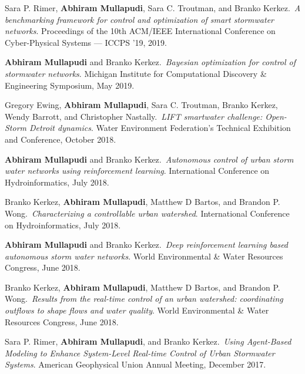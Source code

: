 \documentclass[a4paper,11pt]{article}
\newcommand{\years}[1]{%
  {\reversemarginpar\strut\marginnote{{\small#1}}}%
}
\begin{document}
\years{2019} Sara P. Rimer, \textbf{Abhiram Mullapudi}, Sara C. Troutman, and Branko Kerkez.\ \emph{A benchmarking framework for control and optimization of smart stormwater networks}. Proceedings of the 10th ACM/IEEE International Conference on Cyber-Physical Systems --- ICCPS '19, 2019.\\[.1cm]

\years{2019} \textbf{Abhiram Mullapudi} and Branko Kerkez.\ \emph{Bayesian optimization for control of stormwater networks}. Michigan Institute for Computational Discovery \& Engineering Symposium, May 2019.\\[.1cm]

\years{2018} Gregory Ewing, \textbf{Abhiram Mullapudi}, Sara C. Troutman, Branko Kerkez, Wendy Barrott, and Christopher Nastally.\ \emph{LIFT smartwater challenge: Open-Storm Detroit dynamics}. Water Environment Federation's Technical Exhibition and Conference, October 2018.\\[.1cm]

\years{2018} \textbf{Abhiram Mullapudi} and Branko Kerkez.\ \emph{Autonomous control of urban storm water networks using reinforcement learning}. International Conference on Hydroinformatics, July 2018.\\[.1cm]

\years{2018} Branko Kerkez, \textbf{Abhiram Mullapudi}, Matthew D Bartos, and Brandon P. Wong.\ \emph{Characterizing a controllable urban watershed}. International Conference on Hydroinformatics, July 2018.\\[.1cm]

\years{2018} \textbf{Abhiram Mullapudi} and Branko Kerkez.\ \emph{Deep reinforcement learning based autonomous storm water networks}. World Environmental \& Water Resources Congress, June 2018.\\[.1cm]

\years{2018} Branko Kerkez, \textbf{Abhiram Mullapudi}, Matthew D Bartos, and Brandon P. Wong.\ \emph{Results from the real-time control of an urban watershed: coordinating outflows to shape flows and water quality}. World Environmental \& Water Resources Congress, June 2018.\\[.1cm]

\years{2017} Sara P. Rimer, \textbf{Abhiram Mullapudi}, and Branko Kerkez.\ \emph{Using Agent-Based Modeling to Enhance System-Level Real-time Control of Urban Stormwater Systems}. American Geophysical Union Annual Meeting, December 2017.\\[.1cm]
\end{document}
